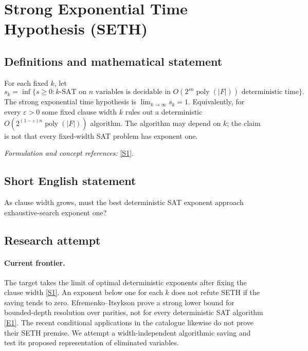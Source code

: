 \documentclass[11pt,a4paper]{article}
\newcommand{\sref}[2]{\hyperlink{source:#1:#2}{[S#2]}}
\newcommand{\eref}[2]{\hyperlink{extra:#1:#2}{[E#2]}}
\newif\ifshowcatalogue
\newcommand{\cataloguescope}[1]{\ifshowcatalogue
 \paragraph{Exact scope in the supplied catalogue.}
 \begin{quote}\small #1\end{quote}\fi}
\numberwithin{equation}{section}
\begin{document}
\setcounter{section}{64}
\clearpage
\section{\texorpdfstring{Strong Exponential Time Hypothesis (SETH)}{Strong Exponential Time Hypothesis (SETH)}}\label{65}
\subsection{Definitions and mathematical statement}
For each fixed $k$, let
\[
 s_k=\inf\{s\ge0:k\text{-SAT on }n\text{ variables is decidable in }
 O(2^{sn}\operatorname{poly}(|F|))\text{ deterministic time}\}.
\]
The strong exponential time hypothesis is $\lim_{k\to\infty}s_k=1$. Equivalently, for every $\varepsilon>0$ some fixed clause width $k$ rules out a deterministic $O(2^{(1-\varepsilon)n}\operatorname{poly}(|F|))$ algorithm. The algorithm may depend on $k$; the claim is not that every fixed-width SAT problem has exponent one.
\par\smallskip\textit{Formulation and concept references:} \sref{65}{1}.
\cataloguescope{Prove or disprove that the optimal exponent s\_k for k-SAT satisfies lim\_\{k to infinity\} s\_k = 1.}
\subsection{Short English statement}
As clause width grows, must the best deterministic SAT exponent approach exhaustive-search exponent one?
\subsection{Research attempt}

\paragraph{Current frontier.}
The target takes the limit of optimal deterministic exponents after fixing the clause width \sref{65}{1}. An exponent below one for each $k$ does not refute SETH if the saving tends to zero. Efremenko--Itsykson prove a strong lower bound for bounded-depth resolution over parities, not for every deterministic SAT algorithm \eref{65}{1}. The recent conditional applications in the catalogue likewise do not prove their SETH premise. We attempt a width-independent algorithmic saving and test its proposed representation of eliminated variables.
\end{document}
